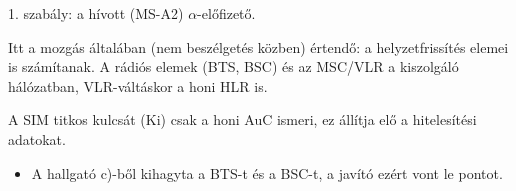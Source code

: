 1. szabály: a hívott (MS-A2) $\alpha$-előfizető.

\begin{center}\end{center}

Itt a mozgás általában (nem beszélgetés közben) értendő: a helyzetfrissítés elemei is számítanak. A rádiós elemek (BTS, BSC) és az MSC/VLR a kiszolgáló hálózatban, VLR-váltáskor a honi HLR is.

\begin{center}\end{center}

A SIM titkos kulcsát (Ki) csak a honi AuC ismeri, ez állítja elő a hitelesítési adatokat.

\begin{center}\end{center}
\begin{eredmeny}

\begin{center}\end{center}
\end{eredmeny}
\begin{tipp}[Ellenőrzés]
\begin{itemize}
\item A hallgató c)-ből kihagyta a BTS-t és a BSC-t, a javító ezért vont le pontot.
\end{itemize}
\end{tipp}


